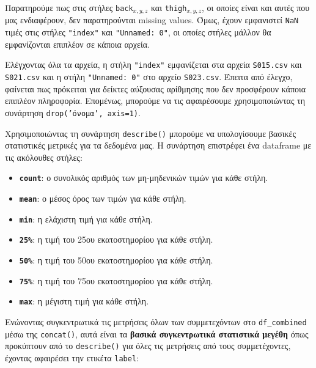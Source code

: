         Παρατηρούμε πως στις στήλες \texttt{back}\(_{x,y,z}\) και \texttt{thigh}\(_{x,y,z}\), οι οποίες είναι και αυτές που μας ενδιαφέρουν, δεν παρατηρούνται missing values.
        Όμως, έχουν εμφανιστεί \texttt{NaN} τιμές στις στήλες \texttt{"index"} και \texttt{"Unnamed: 0"}, οι οποίες στήλες μάλλον θα εμφανίζονται επιπλέον σε κάποια αρχεία.

        Ελέγχοντας όλα τα αρχεία, η στήλη \texttt{"index"} εμφανίζεται στα αρχεία \texttt{S015.csv} και \texttt{S021.csv} και η στήλη \texttt{"Unnamed: 0"} στο αρχείο \texttt{S023.csv}.
        Έπειτα από έλεγχο, φαίνεται πως πρόκειται για δείκτες αύξουσας αρίθμησης που δεν προσφέρουν κάποια επιπλέον πληροφορία.
        Επομένως, μπορούμε να τις αφαιρέσουμε χρησιμοποιώντας τη συνάρτηση \texttt{drop('όνομα', axis=1)}.

        Χρησιμοποιώντας τη συνάρτηση \texttt{describe()} μπορούμε να υπολογίσουμε βασικές στατιστικές μετρικές για τα δεδομένα μας.
        Η συνάρτηση επιστρέφει ένα dataframe με τις ακόλουθες στήλες:

        \vspace{-3mm}
        \begin{itemize}[label={\tiny \blacksquare}]
            \addtolength\itemsep{-3mm}
            \item \texttt{\textbf{count}}: ο συνολικός αριθμός των μη-μηδενικών τιμών για κάθε στήλη.
            \item \texttt{\textbf{mean}}: ο μέσος όρος των τιμών για κάθε στήλη.
            \item \texttt{\textbf{min}}: η ελάχιστη τιμή για κάθε στήλη.
            \item \texttt{\textbf{25\%}}: η τιμή του 25ου εκατοστημορίου για κάθε στήλη.
            \item \texttt{\textbf{50\%}}: η τιμή του 50ου εκατοστημορίου για κάθε στήλη.
            \item \texttt{\textbf{75\%}}: η τιμή του 75ου εκατοστημορίου για κάθε στήλη.
            \item \texttt{\textbf{max}}: η μέγιστη τιμή για κάθε στήλη.
        \end{itemize}

        Ενώνοντας συγκεντρωτικά τις μετρήσεις όλων των συμμετεχόντων στο \texttt{df\_combined} μέσω της \texttt{concat()},
        αυτά είναι τα \textbf{βασικά συγκεντρωτικά στατιστικά μεγέθη} όπως προκύπτουν από το \texttt{describe()}
        για όλες τις μετρήσεις από τους συμμετέχοντες, έχοντας αφαιρέσει την ετικέτα \texttt{label}:

